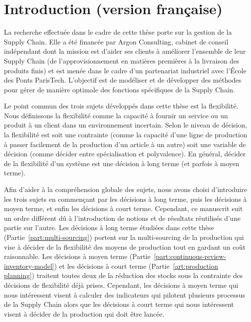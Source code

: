 \chapter{Introduction (version française)}
\label{chap:intro:fr}


La recherche effectuée dans le cadre de cette thèse porte sur la gestion de la Supply Chain.
Elle a été financée par Argon Consulting, cabinet de conseil indépendant dont la mission est d'aider ses clients à améliorer l'ensemble de leur Supply Chain (de l'approvisionnement en matières premières à la livraison des produits finis) et est menée dans le cadre d'un partenariat industriel avec l'\'Ecole des Ponts ParisTech.
L'objectif est de modéliser et de développer des méthodes pour gérer de manière optimale des fonctions spécifiques de la Supply Chain.


Le point commun des trois sujets développés dans cette thèse est la flexibilité.
Nous définissons la flexibilité comme la capacité à fournir un service ou un produit à un client dans un environnement incertain.
Selon le niveau de décision, la flexibilité est soit une contrainte (comme la capacité d'une ligne de production à passer facilement de la production d'un article à un autre) soit une variable de décision (comme décider entre spécialisation et polyvalence).
En général, décider de la flexibilité d'un système est une décision à long terme (et parfois à moyen terme).


Afin d'aider à la compréhension globale des sujets, nous avons choisi d'introduire les trois sujets en commençant par les décisions à long terme, puis les décisions à moyen terme, et enfin les décisions à court terme.
Cependant, ce manuscrit suit un ordre différent dû à l'introduction de notions et de résultats réutilisés d'une partie sur l'autre.
Les décisions à long terme étudiées dans cette thèse (Partie~\ref{part:multi-sourcing}) portent sur la multi-sourcing de la production qui vise à décider de la flexibilité des moyens de production tout en gardant un coût raisonnable.
Les décisions à moyen terme (Partie~\ref{part:continuous-review-inventory-model}) et les décisions à court terme (Partie~\ref{art:production planning}) traitent toutes deux de la réduction des stocks sous la contrainte des décisions de flexibilité déjà prises.
Cependant, les décisions à moyen terme qui nous intéressent visent à calculer des indicateurs qui pilotent plusieurs processus de la Supply Chain alors que les décisions à court terme qui nous intéressent visent à décider de la production qui doit être lancée.


